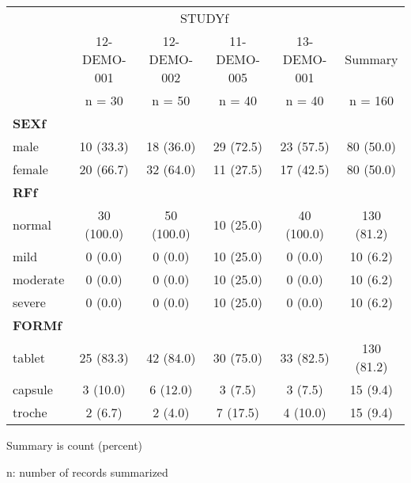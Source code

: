 \setlength{\tabcolsep}{5pt} 
\begin{threeparttable}
\renewcommand{\arraystretch}{1.3}
\begin{tabular}[h]{lccccc}
\hline
\multicolumn{1}{c}{} & \multicolumn{4}{c}{STUDYf} & \multicolumn{1}{c}{} \\
\cmidrule(lr){2-5}
 & 12-DEMO-001 & 12-DEMO-002 & 11-DEMO-005 & 13-DEMO-001 & Summary \\ [-0.52em]
 & n = 30 & n = 50 & n = 40 & n = 40 & n = 160 \\
\hline
\multicolumn{6}{l}{\textbf{SEXf}}\\%
male & 10 (33.3) & 18 (36.0) & 29 (72.5) & 23 (57.5) & 80 (50.0) \\
female & 20 (66.7) & 32 (64.0) & 11 (27.5) & 17 (42.5) & 80 (50.0) \\
\hline \multicolumn{6}{l}{\textbf{RFf}}\\%
normal & 30 (100.0) & 50 (100.0) & 10 (25.0) & 40 (100.0) & 130 (81.2) \\
mild & 0 (0.0) & 0 (0.0) & 10 (25.0) & 0 (0.0) & 10 (6.2) \\
moderate & 0 (0.0) & 0 (0.0) & 10 (25.0) & 0 (0.0) & 10 (6.2) \\
severe & 0 (0.0) & 0 (0.0) & 10 (25.0) & 0 (0.0) & 10 (6.2) \\
\hline \multicolumn{6}{l}{\textbf{FORMf}}\\%
tablet & 25 (83.3) & 42 (84.0) & 30 (75.0) & 33 (82.5) & 130 (81.2) \\
capsule & 3 (10.0) & 6 (12.0) & 3 (7.5) & 3 (7.5) & 15 (9.4) \\
troche & 2 (6.7) & 2 (4.0) & 7 (17.5) & 4 (10.0) & 15 (9.4) \\
\hline
\end{tabular}
\begin{tablenotes}[flushleft]
\item Summary is count (percent)
\item n: number of records summarized
\end{tablenotes}
\end{threeparttable}
